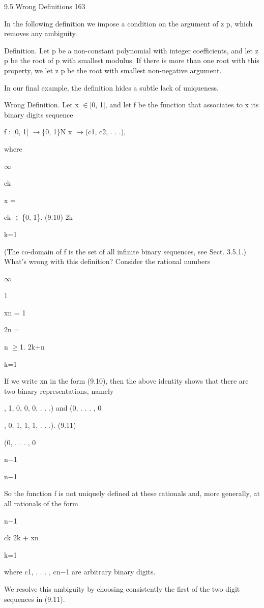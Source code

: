 \documentclass[11pt]{article}
\theoremstyle{plain}
\theoremstyle{definition}
\begin{document}
9.5 Wrong Definitions 163

In the following definition we impose a condition on the argument of z p, which removes any ambiguity.

Definition. Let p be a non-constant polynomial with integer coefficients, and let z p be the root of p with smallest modulus. If there is more than one root with this property, we let z p be the root with smallest non-negative argument.

In our final example, the definition hides a subtle lack of uniqueness.

Wrong Definition. Let x $\in$[0, 1], and let f be the function that associates to x its binary digits sequence

f : [0, 1] $\to$\{0, 1\}N x $\to$(c1, c2, . . .),

where

$\infty$

ck

x =

ck $\in$\{0, 1\}. (9.10) 2k

k=1

(The co-domain of f is the set of all infinite binary sequences, see Sect. 3.5.1.) What's wrong with this definition? Consider the rational numbers

$\infty$

1

xn = 1

2n =

n $\geq$1. 2k+n

k=1

If we write xn in the form (9.10), then the above identity shows that there are two binary representations, namely

, 1, 0, 0, 0, . . .) and (0, . . . , 0

, 0, 1, 1, 1, . . .). (9.11)

(0, . . . , 0

n$-$1

n$-$1

So the function f is not uniquely defined at these rationals and, more generally, at all rationals of the form

n$-$1

ck 2k + xn

k=1

where c1, . . . , cn$-$1 are arbitrary binary digits.

We resolve this ambiguity by choosing consistently the first of the two digit sequences in (9.11).
\end{document}
